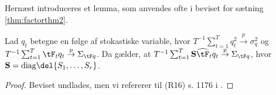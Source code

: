 %
%
Hernæst introduceres et lemma, som anvendes ofte i beviset for sætning \ref{thm:factorthm2}.
%
\begin{lem} \label{lem:factorlem1}
Lad \(q_t\) betegne en følge af stokastiske variable, hvor \(T^{-1} \sum_{t=1}^T q_t^2 \overset{p}{\rightarrow} \sigma_q^2\) og \(T^{-1} \sum_{t=1}^T \tF_t q_t \overset{p}{\rightarrow} \Sigma_{\tF q}\).
Da gælder, at \(T^{-1} \sum_{t=1}^T \mathbf{S} \widehat{\tF}_t q_t \overset{p}{\rightarrow} \Sigma_{\tF q}\), hvor \(\mathbf{S} = \text{diag} \del{S_1, \ldots, S_r}\).
\end{lem}
\begin{proof}
Beviset undlades, men vi refererer til (R16) s. 1176 i \citep{stock_watson_2002a}.
\end{proof}
%
